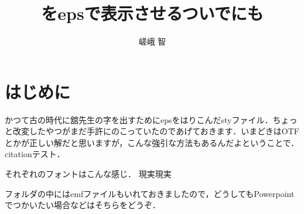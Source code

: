 \documentclass[a4paper]{jsarticle}
\begin{document}
%
\title{\tachi \susumu をepsで表示させるついでに\virtual も} %
\author{嵯峨 智} %
%
\maketitle
%
\section{はじめに}
かつて古の時代に舘先生の字を出すためにepsをはりこんだstyファイル．ちょっと改変したやつがまだ手許にのこっていたのであげておきます．いまどきはOTFとかが正しい解だと思いますが，こんな強引な方法もあるんだよということで．
citationテスト\cite{110003183950}．

それぞれのフォントはこんな感じ．\mtachi \msusumu \gtachi \gsusumu 
\virtual 現実\gvirtual \simplevirtual 現実\gsimplevirtual

フォルダの中にはemfファイルもいれておきましたので，どうしてもPowerpointでつかいたい場合などはそちらをどうぞ．



%
%

\end{document}
